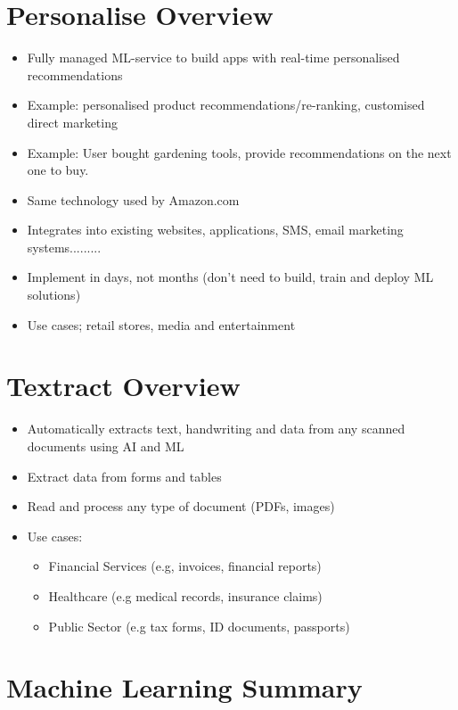 \section{Personalise Overview}
\begin{itemize}
    \item Fully managed ML-service to build apps with real-time personalised recommendations
    \item Example: personalised product recommendations/re-ranking, customised direct marketing
    \item Example: User bought gardening tools, provide recommendations on the next one to buy.
    \item Same technology used by Amazon.com
    \item Integrates into existing websites, applications, SMS, email marketing systems.........
    \item Implement in days, not months (don't need to build, train and deploy ML solutions)
    \item Use cases; retail stores, media and entertainment
\end{itemize}


\section{Textract Overview}
\begin{itemize}
    \item Automatically extracts text, handwriting and data from any scanned documents using AI and ML
    \item Extract data from forms and tables
    \item Read and process any type of document (PDFs, images)
    \item Use cases:
    \begin{itemize}
        \item Financial Services (e.g, invoices, financial reports)
        \item Healthcare (e.g medical records, insurance claims)
        \item Public Sector (e.g tax forms, ID documents, passports)
    \end{itemize}
\end{itemize}


\section{Machine Learning Summary}

